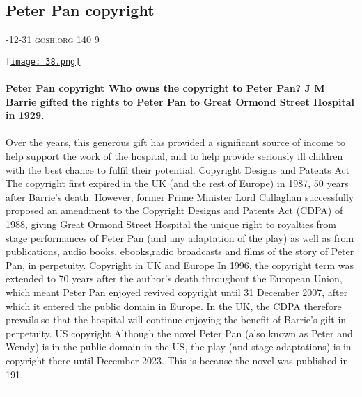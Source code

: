 \documentclass[10pt,a4paper]{article}
\begin{document}
\begin{multicols*}{2}
\begin{minipage}{\linewidth}
\subsection{Peter Pan copyright}
\textsc{\footnotesize
{\scriptsize\faCalendar}-12-31 
{\scriptsize\faGlobe}\space 
gosh.org 
{\scriptsize\faThumbsOUp}\space 
\href{http://news.ycombinator.com/item?id=37128929\&utm\_term=comment}{140} 
{\scriptsize\faComments}\space 
\href{http://news.ycombinator.com/item?id=37128929\&utm\_term=comment}{9} 
}
\par\medskip\noindent
\href{https://www.gosh.org/about-us/peter-pan/copyright/?utm\_source=hackernewsletter\&utm\_medium=email\&utm\_term=books}{
    \texttt{[image: 38.png]}
}
\end{minipage}
\paragraph{}
\textbf{Peter Pan copyright
Who owns the copyright to Peter Pan?
J M Barrie gifted the rights to Peter Pan to Great Ormond Street Hospital in 1929.}
\paragraph{}
 Over the years, this generous gift has provided a significant source of income to help support the work of the hospital, and to help provide seriously ill children with the best chance to fulfil their potential.
Copyright Designs and Patents Act
The copyright first expired in the UK (and the rest of Europe) in 1987, 50 years after Barrie’s death.
However, former Prime Minister Lord Callaghan successfully proposed an amendment to the Copyright Designs and Patents Act (CDPA) of 1988, giving Great Ormond Street Hospital the unique right to royalties from stage performances of Peter Pan (and any adaptation of the play) as well as from publications, audio books, ebooks,radio broadcasts and films of the story of Peter Pan, in perpetuity.
Copyright in UK and Europe
In 1996, the copyright term was extended to 70 years after the author’s death throughout the European Union, which meant Peter Pan enjoyed revived copyright until 31 December 2007, after which it entered the public domain in Europe.
In the UK, the CDPA therefore prevails so that the hospital will continue enjoying the benefit of Barrie’s gift in perpetuity.
US copyright
Although the novel Peter Pan (also known as Peter and Wendy) is in the public domain in the US, the play (and stage adaptations) is in copyright there until December 2023.
This is because the novel was published in 191
\par\noindent\textcolor{red}{\rule{\linewidth}{0.2mm}}
\vfill
\null
\noindent\begin{minipage}{\linewidth}

\end{minipage}
\end{multicols*}
\end{document}
